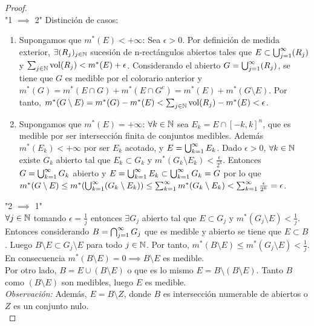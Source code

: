 \begin{proof}
    \leavevmode\\
    "1 $\implies$ 2"
    Distinción de casos:
    \begin{enumerate}
        \item Supongamos que $m^*(E) < +\infty$: Sea $\epsilon > 0$. Por definición de medida
              exterior, $\exists (R_j)_{j \in \mathbb{N}}$ sucesión de n-rectángulos abiertos tales
              que $E \subset \bigcup_{j=1}^{\infty}(R_j)$ y $\sum_{j \in \mathbb{N}} \text{vol}(R_j) < m^*(E) +
                  \epsilon$. Considerando el abierto $G = \bigcup_{j=1}^{\infty}(R_j)$, se tiene que $G$ es medible
              por el colorario anterior y $m^*(G) = m^*(E \cap G) + m^*(E \cap G^c) = m^*(E)
                  + m^*(G \setminus E)$. Por tanto, $m^*(G \setminus E) = m^*(G) - m^*(E) <
                  \sum_{j \in \mathbb{N}} \text{vol}(R_j) - m^*(E) < \epsilon$.
        \item Supongamos que $m^*(E) = +\infty$: $\forall k \in \mathbb{N}$ sea $E_k = E \cap
                  [-k,k]^n$, que es medible por ser intersección finita de conjuntos medibles.
              Además $m^*(E_k) < +\infty$ por ser $E_k$ acotado, y $E = \bigcup_{k=1}^{\infty}{E_k}$. Dado
              $\epsilon > 0$, $\forall k \in \mathbb{N}$ existe $G_k$ abierto tal que $E_k \subset
                  G_k$ y $m^*(G_k \setminus E_k) < \frac{\epsilon}{2^k}$. Entonces $G =
                  \bigcup_{k=1}^{\infty}{G_k}$ abierto y $E = \bigcup_{k=1}^{\infty}{E_k} \subset \bigcup_{k=1}^{\infty}{G_k} = G$ por lo que $m^*(G
                  \setminus E) \leq m^*(\bigcup_{k=1}^{\infty}(G_k \setminus E_k)) \leq \sum_{k=1}^{\infty}{m^*(G_k \setminus E_k)}
                  < \sum_{k=1}^{\infty}{\frac{\epsilon}{2^k}} = \epsilon$.
    \end{enumerate}
    "2 $\implies$ 1"\\
    $\forall j \in \mathbb{N}$ tomando $\epsilon = \frac{1}{j}$ entonces $\exists G_j$ abierto tal que $E \subset G_j$ y $m^*(G_j \setminus E) < \frac{1}{j}$. Entonces considerando $B = \bigcap_{j=1}^{\infty}{G_j}$ que es medible y abierto se tiene que $E \subset B$. Luego $B \setminus E \subset G_j \setminus E$ para todo $j \in \mathbb{N}$. Por tanto, $m^*(B \setminus E) \leq m^*(G_j \setminus E) < \frac{1}{j}$. En consecuencia $m^*(B \setminus E) = 0 \implies B \setminus E$ es medible.\\
    Por otro lado, $B = E \cup (B \setminus E)$ o que es lo mismo $E = B \setminus (B \setminus E)$. Tanto $B$ como $(B \setminus E)$ son medibles, luego $E$ es medible.\\
    \textit{Observación:} Además, $E = B \setminus Z$, donde $B$ es intersección numerable de abiertos o $Z$ es un conjunto nulo.\\

\end{proof}
